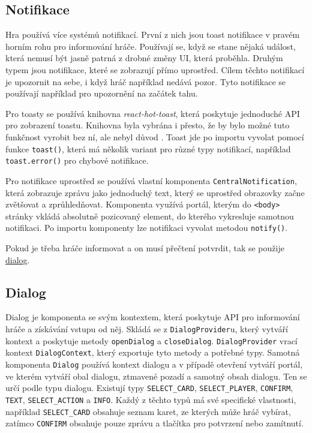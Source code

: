 \subsection{Notifikace}
Hra používá více systémů notifikací. První z nich jsou toast notifikace v pravém horním rohu pro informování hráče. Používají se, když se stane nějaká událost, která nemusí být jasně patrná z drobné změny UI, která proběhla. Druhým typem jsou notifikace, které se zobrazují přímo uprostřed. Cílem těchto notifikací je upozornit na sebe, i když hráč například nedává pozor. Tyto notifikace se používají například pro upozornění na začátek tahu.

Pro toasty se používá knihovna \emph{react-hot-toast}, která poskytuje jednoduché API pro zobrazení toastu. Knihovna byla vybrána i přesto, že by bylo možné tuto funkčnost vyrobit bez ní, ale nebyl důvod . Toast jde po importu vyvolat pomocí funkce \texttt{toast()}, která má několik variant pro různé typy notifikací, například \texttt{toast.error()} pro chybové notifikace.

Pro notifikace uprostřed se používá vlastní komponenta \texttt{CentralNotification}, která zobrazuje zprávu jako jednoduchý text, který se uprostřed obrazovky začne zvětšovat a zprůhledňovat. Komponenta využívá portál, kterým do \texttt{<body>} stránky vkládá absolutně pozicovaný element, do kterého vykresluje samotnou notifikaci. Po importu komponenty lze notifikaci vyvolat metodou \texttt{notify()}.

Pokud je třeba hráče informovat a on musí přečtení potvrdit, tak se použije \hyperlink{dialog}{dialog}.
\hypertarget{dialog}{}\subsection{Dialog}
Dialog je komponenta se svým kontextem, která poskytuje API pro informování hráče a získávání vstupu od něj. Skládá se z \texttt{DialogProvider}u, který vytváří kontext a poskytuje metody \texttt{openDialog} a \texttt{closeDialog}. \texttt{DialogProvider} vrací kontext \texttt{DialogContext}, který exportuje tyto metody a potřebné typy.
Samotná komponenta \texttt{Dialog} používá kontext dialogu a v případě otevření vytváří portál, ve kterém vytváří obal dialogu, ztmavené pozadí a samotný obsah dialogu. Ten se určí podle typu dialogu. Existují typy \texttt{SELECT\_CARD}, \texttt{SELECT\_PLAYER}, \texttt{CONFIRM}, \texttt{TEXT}, \texttt{SELECT\_ACTION} a \texttt{INFO}. Každý z těchto typů má své specifické vlastnosti, například \texttt{SELECT\_CARD} obsahuje seznam karet, ze kterých může hráč vybírat, zatímco \texttt{CONFIRM} obsahuje pouze zprávu a tlačítka pro potvrzení nebo zamítnutí.


